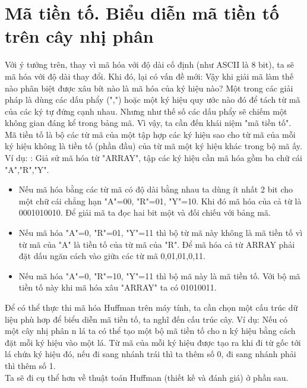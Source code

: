 \section{Mã tiền tố. Biểu diễn mã tiền tố trên cây nhị phân}
Với ý tưởng trên, thay vì mã hóa với độ dài cố định (như ASCII là 8 bit), ta sẽ mã hóa với độ dài thay đổi. Khi đó, lại có vấn đề mới: Vậy khi giải mã làm thế nào phân biệt được xâu bít nào là mã hóa của ký hiệu nào? Một trong các giải pháp là dùng các dấu phẩy (",") hoặc một ký hiệu quy ước nào đó để tách từ mã của các ký tự đứng cạnh nhau. Nhưng như thế số các dấu phẩy sẽ chiếm một không gian đáng kể trong bảng mã. Vì vậy, ta cần đến khái niệm "mã tiền tố".\\
\indent{} Mã tiền tố là bộ các từ mã của một tập hợp các ký hiệu sao cho từ mã của mỗi ký hiệu không là tiền tố (phần đầu) của từ mã một ký hiệu khác trong bộ mã ấy.\\
\indent{} Ví dụ: : Giả sử mã hóa từ "ARRAY", tập các ký hiệu cần mã hóa gồm ba chữ cái "A","R","Y".\\
\begin{itemize}
    \item Nếu mã hóa bằng các từ mã có độ dài bằng nhau ta dùng ít nhất 2 bit cho một chữ cái chẳng hạn "A"=00, "R"=01, "Y"=10. Khi đó mã hóa của cả từ là 0001010010. Để giải mã ta đọc hai bit một và đối chiếu với bảng mã.
    \item Nếu mã hóa "A"=0, "R"=01, "Y"=11 thì bộ từ mã này không là mã tiền tố vì từ mã của "A" là tiền tố của từ mã của "R". Để mã hóa cả từ ARRAY phải đặt dấu ngăn cách vào giữa các từ mã 0,01,01,0,11.
    \item Nếu mã hóa "A"=0, "R"=10, "Y"=11 thì bộ mã này là mã tiền tố. Với bộ mã tiền tố này khi mã hóa xâu "ARRAY" ta có 01010011.
\end{itemize}
\indent{} Để có thể thực thi mã hóa Huffman trên máy tính, ta cần chọn một cấu trúc dữ liệu phù hơp để biểu diễn mã tiền tố, ta nghĩ đến cấu trúc cây. Ví dụ: Nếu có một cây nhị phân n lá ta có thể tạo một bộ mã tiền tố cho n ký hiệu bằng cách đặt mỗi ký hiệu vào một lá. Từ mã của mỗi ký hiệu được tạo ra khi đi từ gốc tới lá chứa ký hiệu đó, nếu đi sang nhánh trái thì ta thêm số 0, đi sang nhánh phải thì thêm số 1.\\
\indent{} Ta sẽ đi cụ thể hơn về thuật toán Huffman (thiết kế và đánh giá) ở phần sau.